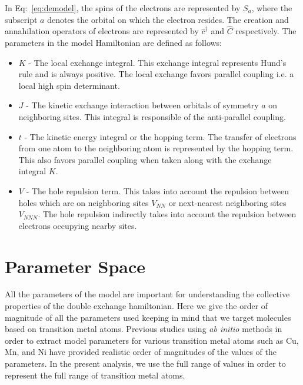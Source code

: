 \documentclass[ openright,titlepage,numbers=noenddot,headinclude,twoside,%
                footinclude=true,cleardoublepage=empty,abstractoff,%
                BCOR=5mm,paper=a4,fontsize=11pt,%
                ngerman,american,%
]{scrreprt}
\begin{document}
In Eq:~\ref{eq:demodel}, the spins of the electrons are represented by $S_a$,
where the subscript $a$ denotes the orbital on which the electron resides.  The
creation and annahilation operators of electrons are represented by
$\hat{c}^{\dagger}$ and $\hat{C}$ respectively. The parameters in the model
Hamiltonian are defined as follows:

\begin{itemize}

\item $K$ - The local exchange integral. This exchange integral represents
  Hund's rule and is always positive. The local exchange favors parallel
  coupling i.e. a local high spin determinant.

\item $J$ - The kinetic exchange interaction between orbitals of symmetry $a$
  on neighboring sites. This integral is responsible of the anti-parallel coupling.

\item $t$ - The kinetic energy integral or the hopping term. The
  transfer of electrons from one atom to the neighboring atom is represented
  by the hopping term. This also favors parallel coupling when taken along with
  the exchange integral $K$.

\item $V$ - The hole repulsion term. This takes into account the repulsion between
  holes which are on neighboring sites $V_{NN}$ or next-nearest neighboring sites $V_{NNN}$. The hole repulsion indirectly takes into account the repulsion between
  electrons occupying nearby sites.\cite{calzado_proposal_2001}

\end{itemize}

\section{Parameter Space}

All the parameters of the model are important for understanding the collective
properties of the double exchange hamiltonian. Here we give the order of magnitude
of all the parameters used keeping in mind that we target molecules based on
transition metal atoms.
Previous studies using \textit{ab initio} methods in order to extract model
parameters for various transition metal atoms such as Cu, Mn, and Ni have
provided realistic order of magnitudes of the values of the parameters.
In the present analysis, we use the full range of values in order to represent
the full range of transition metal atoms.
\end{document}
